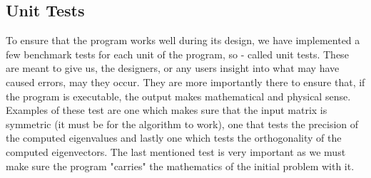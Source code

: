  	\subsection{Unit Tests}
 	To ensure that the program works well during its design, we have implemented a few benchmark tests for each unit of the program, so - called unit tests. These are meant to give us, the designers, or any users insight into what may have caused errors, may they occur. They are more importantly there to ensure that, if the program is executable, the output makes mathematical and physical sense. Examples of these test are one which makes sure that the input matrix is symmetric (it must be for the algorithm to work), one that tests the precision of the computed eigenvalues and lastly one which tests the orthogonality of the computed eigenvectors. The last mentioned test is very important as we must make sure the program "carries" the mathematics of the initial problem with it.
 	\newpage
 	
 	
